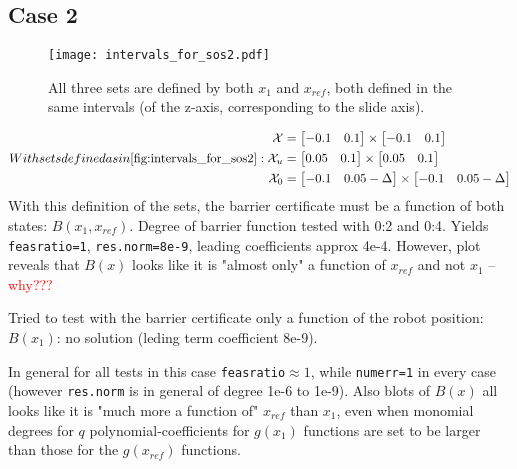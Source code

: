 \newpage
\subsection{Case 2}\label{case2}
\begin{figure}[htbp]
\centering\texttt{[image: intervals\_for\_sos2.pdf]}
\caption{All three sets are defined by both $x_1$ and $x_{ref}$, both defined in the same intervals (of the z-axis, corresponding to the slide axis).}
\label{fig:intervals_for_sos2}
\end{figure}
\begin{subequations}\label{eq:sets_case2}
With sets defined as in \autoref{fig:intervals_for_sos2}:
\begin{align}
	\mathcal{X} &= \begin{bmatrix} -0.1 & 0.1\end{bmatrix} \times \begin{bmatrix} -0.1 & 0.1\end{bmatrix}\\
	\mathcal{X}_u &= \begin{bmatrix} 0.05 & 0.1\end{bmatrix} \times \begin{bmatrix} 0.05 & 0.1\end{bmatrix}\\
	\mathcal{X}_0 &= \begin{bmatrix} -0.1 & 0.05-\Delta\end{bmatrix} \times \begin{bmatrix} -0.1 & 0.05-\Delta\end{bmatrix}
\end{align}
\end{subequations}
With this definition of the sets, the barrier certificate must be a function of both states: $B(x_1,x_{ref})$. Degree of barrier function tested with 0:2 and 0:4. Yields \texttt{feasratio=1}, \texttt{res.norm=8e-9}, leading coefficients approx 4e-4. However, plot reveals that $B(x)$ looks like it is "almost only" a function of $x_{ref}$ and not $x_1$ -- \textcolor{red}{why???}

Tried to test with the barrier certificate only a function of the robot position: $B(x_1)$: no solution (leding term coefficient 8e-9).

In general for all tests in this case \texttt{feasratio}$\approx 1$, while \texttt{numerr=1} in every case (however \texttt{res.norm} is in general of degree 1e-6 to 1e-9). Also blots of $B(x)$ all looks like it is "much more a function of" $x_{ref}$ than $x_1$, even when monomial degrees for $q$ polynomial-coefficients for $g(x_1)$ functions are set to be larger than those for the $g(x_{ref})$ functions.

